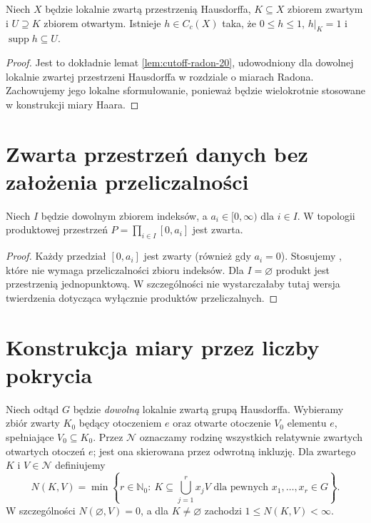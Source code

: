 \ifdefined\Needspace{}\fi
\begin{lemat}
\label{lem:haar-cutoff-23}
Niech $X$ będzie lokalnie zwartą przestrzenią Hausdorffa,
$K\subseteq X$ zbiorem zwartym i $U\supseteq K$ zbiorem
otwartym. Istnieje $h\in C_c(X)$ taka, że
$0\le h\le1$, $h|_K=1$ i $\operatorname{supp}h\subseteq U$.
\end{lemat}
\begin{proof}
Jest to dokładnie lemat \ref{lem:cutoff-radon-20},
udowodniony dla dowolnej lokalnie zwartej przestrzeni
Hausdorffa w rozdziale o miarach Radona. Zachowujemy
jego lokalne sformułowanie, ponieważ będzie wielokrotnie
stosowane w konstrukcji miary Haara.
\end{proof}

\section{Zwarta przestrzeń danych bez założenia przeliczalności}
\begin{lemat}
\label{lem:haar-product-compact-23}
Niech $I$ będzie dowolnym zbiorem indeksów, a
$a_i\in[0,\infty)$ dla $i\in I$. W topologii produktowej
przestrzeń $P=\prod_{i\in I}[0,a_i]$ jest zwarta.
\end{lemat}
\begin{proof}
Każdy przedział $[0,a_i]$ jest zwarty (również gdy
$a_i=0$). Stosujemy
,
które nie wymaga przeliczalności zbioru indeksów.
Dla $I=\varnothing$ produkt jest przestrzenią jednopunktową.
W szczególności nie wystarczałaby tutaj wersja twierdzenia
dotycząca wyłącznie produktów przeliczalnych.
\end{proof}

\section{Konstrukcja miary przez liczby pokrycia}
Niech odtąd $G$ będzie \emph{dowolną} lokalnie zwartą
grupą Hausdorffa. Wybieramy zbiór zwarty $K_0$ będący otoczeniem $e$
oraz otwarte otoczenie $V_0$ elementu $e$,
spełniające $V_0\subseteq K_0$. Przez $\mathcal N$
oznaczamy rodzinę wszystkich relatywnie zwartych otwartych
otoczeń $e$; jest ona skierowana przez odwrotną inkluzję.
Dla zwartego $K$ i $V\in\mathcal N$ definiujemy
\begin{equation}\label{eq:haar-cover-number-23}
 N(K,V)=\min\left\{r\in\mathbb N_0:\
 K\subseteq\bigcup_{j=1}^{r}x_jV
 \text{ dla pewnych }x_1,\dots,x_r\in G\right\}.
\end{equation}
W szczególności $N(\varnothing,V)=0$, a dla
$K\ne\varnothing$ zachodzi $1\le N(K,V)<\infty$.

